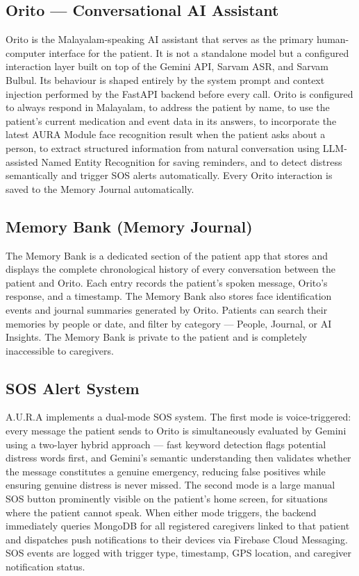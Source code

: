 \subsection{Orito --- Conversational AI Assistant}
Orito is the Malayalam-speaking AI assistant that serves as the primary human-computer interface for the patient. It is not a standalone model but a configured interaction layer built on top of the Gemini API, Sarvam ASR, and Sarvam Bulbul. Its behaviour is shaped entirely by the system prompt and context injection performed by the FastAPI backend before every call. Orito is configured to always respond in Malayalam, to address the patient by name, to use the patient's current medication and event data in its answers, to incorporate the latest AURA Module face recognition result when the patient asks about a person, to extract structured information from natural conversation using LLM-assisted Named Entity Recognition for saving reminders, and to detect distress semantically and trigger SOS alerts automatically. Every Orito interaction is saved to the Memory Journal automatically.

\subsection{Memory Bank (Memory Journal)}
The Memory Bank is a dedicated section of the patient app that stores and displays the complete chronological history of every conversation between the patient and Orito. Each entry records the patient's spoken message, Orito's response, and a timestamp. The Memory Bank also stores face identification events and journal summaries generated by Orito. Patients can search their memories by people or date, and filter by category --- People, Journal, or AI Insights. The Memory Bank is private to the patient and is completely inaccessible to caregivers.

\subsection{SOS Alert System}
A.U.R.A implements a dual-mode SOS system. The first mode is voice-triggered: every message the patient sends to Orito is simultaneously evaluated by Gemini using a two-layer hybrid approach --- fast keyword detection flags potential distress words first, and Gemini's semantic understanding then validates whether the message constitutes a genuine emergency, reducing false positives while ensuring genuine distress is never missed. The second mode is a large manual SOS button prominently visible on the patient's home screen, for situations where the patient cannot speak. When either mode triggers, the backend immediately queries MongoDB for all registered caregivers linked to that patient and dispatches push notifications to their devices via Firebase Cloud Messaging. SOS events are logged with trigger type, timestamp, GPS location, and caregiver notification status.


